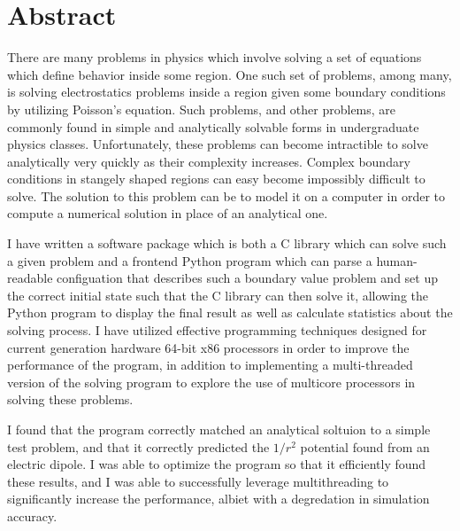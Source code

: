 \documentclass[12pt]{article}
\begin{document}
\renewcommand{\thepage}{\arabic{page}}
\setcounter{page}{1}
\section*{Abstract}

\onehalfspacing

There are many problems in physics which involve solving a set of equations which define behavior
inside some region. One such set of problems, among many, is solving electrostatics problems inside
a region given some boundary conditions by utilizing Poisson's equation. Such problems, and other
problems, are commonly found in simple and analytically solvable forms in undergraduate physics classes.
Unfortunately, these problems can become intractible to solve analytically very quickly as their complexity
increases. Complex boundary conditions in stangely shaped regions can easy become impossibly difficult to
solve. The solution to this problem can be to model it on a computer in order to compute a numerical solution
in place of an analytical one.

I have written a software package which is both a C library which can solve such a given problem and a frontend
Python program which can parse a human-readable configuation that describes such a boundary value problem and
set up the correct initial state such that the C library can then solve it, allowing the Python program to
display the final result as well as calculate statistics about the solving process. I have utilized effective
programming techniques designed for current generation hardware 64-bit x86 processors in order to improve
the performance of the program, in addition to implementing a multi-threaded version of the solving program
to explore the use of multicore processors in solving these problems.

I found that the program correctly matched an analytical soltuion to a simple test problem, and that it correctly
predicted the $1/r^2$ potential found from an electric dipole. I was able to optimize the program so that it
efficiently found these results, and I was able to successfully leverage multithreading to significantly increase
the performance, albiet with a degredation in simulation accuracy.

\clearpage
\doublespacing







\end{document}
